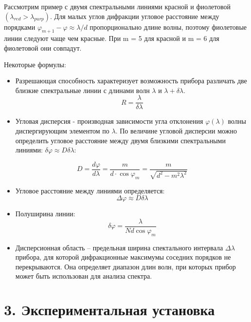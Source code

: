\documentclass[a4paper,12pt]{report}
\begin{document}
Рассмотрим пример с двумя спектральными линиями красной и фиолетовой $(\lambda_{red}> \lambda_{purp})$. Для малых углов дифракции угловое расстояние между порядками $\varphi_{m+1} - \varphi \approx \lambda /d$ пропорционально длине волны, поэтому фиолетовые линии следуют чаще чем красные. При m = 5 для красной и m = 6 для фиолетовой они совпадут. 

Некоторые формулы:

\begin{itemize}
    \item Разрешающая способность характеризует возможность прибора различать две близкие спектральные линии с длинами волн $\lambda$ и $\lambda + \delta \lambda$.
    \begin{equation}
        R = \frac{\lambda}{\delta \lambda}
    \end{equation}

    \item Угловая дисперсия - производная зависимости угла отклонения $\varphi(\lambda)$ волны диспергирующим элементом по $\lambda$. По величине угловой дисперсии можно определить угловое расстояние между двумя близкими спектральными линиями: $\delta \varphi \approx D \delta \lambda$:

    \begin{equation}
        D = \frac{d \varphi}{d \lambda} = \frac{m}{d \cdot \cos{\varphi_m}} = \frac{m}{\sqrt{d^2 - m^2 \lambda^2}}
    \end{equation}

    \item Угловое расстояние между линиями определяется:
    \begin{equation}
        \Delta \varphi \approx D \delta \lambda
    \end{equation}

    \item Полуширина линии:
    \begin{equation}
        \delta \varphi = \frac{\lambda}{Nd \cos{\varphi_m}}
    \end{equation}

    \item Дисперсионная область – предельная ширина спектального интервала $\Delta \lambda$ прибора, для которой дифракционные максимумы соседних порядков не перекрываются. Она определяет диапазон длин волн, при которых прибор может быть использован для анализа спектра.
\end{itemize}

\section*{3. Экспериментальная установка}
\end{document}
